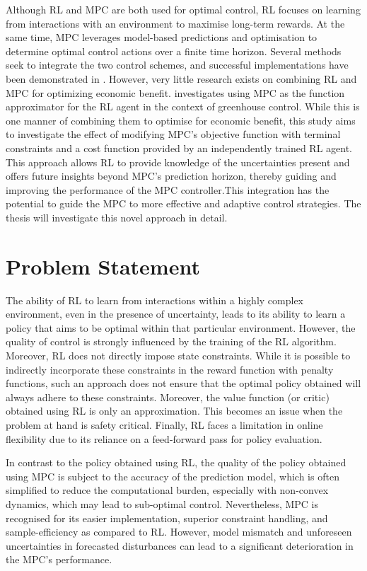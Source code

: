 Although  RL and MPC are both used for optimal control, RL focuses on learning from interactions with an environment to maximise long-term rewards. At the same time, MPC leverages model-based predictions and optimisation to determine optimal control actions over a finite time horizon. Several methods seek to integrate the two control schemes, and successful implementations have been demonstrated in \cite{lubbersAutonomousGreenhouseClimate2023, arroyoReinforcedModelPredictive2022, linReinforcementLearningBasedModel2023}. However, very little research exists on combining RL and MPC for optimizing economic benefit. \citet{lubbersAutonomousGreenhouseClimate2023} investigates using MPC as the function approximator for the RL agent in the context of greenhouse control. While this is one manner of combining them to optimise for economic benefit, this study aims to investigate the effect of modifying MPC's objective function with terminal constraints and a cost function provided by an independently trained RL agent. This approach allows RL to provide knowledge of the uncertainties present and offers future insights beyond MPC's prediction horizon, thereby guiding and improving the performance of the MPC controller.This integration has the potential to guide the MPC to more effective and adaptive control strategies. The thesis will investigate this novel approach in detail.


\section{Problem Statement}

The ability of RL to learn from interactions within a highly complex environment, even in the presence of uncertainty, leads to its ability to learn a policy that aims to be optimal within that particular environment. However, the quality of control is strongly influenced by the training of the RL algorithm. Moreover, RL does not directly impose state constraints. While it is possible to indirectly incorporate these constraints  in the reward function with penalty functions, such an approach does not ensure that the optimal policy obtained will always adhere to these constraints. Moreover, the value function (or critic) obtained using RL is only an approximation. This becomes an issue when the problem at hand is safety critical. Finally, RL faces a limitation in online flexibility due to its reliance on a feed-forward pass for policy evaluation.

In contrast to the policy obtained using RL, the quality of the policy obtained using MPC is subject to the accuracy of the prediction model, which is often simplified to reduce the computational burden, especially with non-convex dynamics, which may lead to sub-optimal control. Nevertheless, MPC is recognised for its easier implementation, superior constraint handling, and sample-efficiency as compared to RL. However, model mismatch and unforeseen uncertainties in forecasted disturbances can lead to a significant deterioration in the MPC's performance. 

